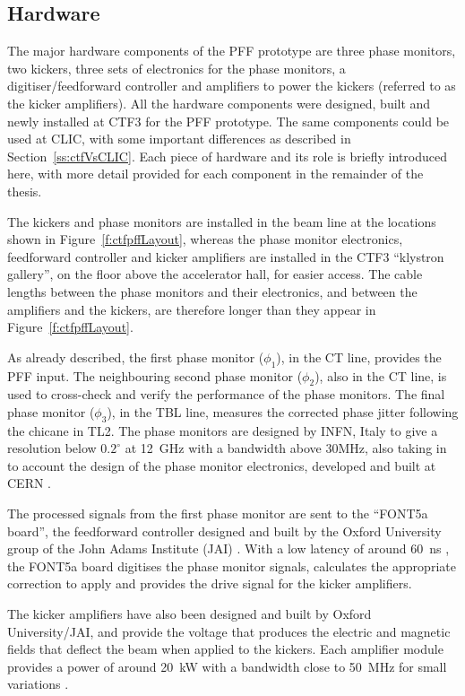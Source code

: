 \subsection{Hardware}
\label{ss:ctfPFFHardware}

The major hardware components of the PFF prototype are three phase monitors, two kickers, three sets of electronics for the phase monitors, a digitiser/feedforward controller and amplifiers to power the kickers (referred to as the kicker amplifiers). All the hardware components were designed, built and newly installed at CTF3 for the PFF prototype. The same components could be used at CLIC, with some important differences as described in Section~\ref{ss:ctfVsCLIC}. Each piece of hardware and its role is briefly introduced here, with more detail provided for each component in the remainder of the thesis.

The kickers and phase monitors are installed in the beam line at the locations shown in Figure~\ref{f:ctfpffLayout}, whereas the phase monitor electronics, feedforward controller and kicker amplifiers are installed in the CTF3 ``klystron gallery'', on the floor above the accelerator hall, for easier access. The cable lengths between the phase monitors and their electronics, and between the amplifiers and the kickers, are therefore longer than they appear in Figure~\ref{f:ctfpffLayout}.

As already described, the first phase monitor (\(\phi_1\)), in the CT line, provides the PFF input. The neighbouring second phase monitor (\(\phi_2\)), also in the CT line, is used to cross-check and verify the performance of the phase monitors. The final phase monitor (\(\phi_3\)), in the TBL line, measures the corrected phase jitter following the chicane in TL2. The phase monitors are designed by INFN, Italy \cite{phMonEuCard} to give a resolution below \(0.2^\circ\) at 12~GHz with a bandwidth above 30MHz, also taking in to account the  design of the phase monitor electronics, developed and built at CERN \cite{phMonEuCard}.

The processed signals from the first phase monitor are sent to the ``FONT5a board'', the feedforward controller designed and built by the Oxford University group of the John Adams Institute (JAI) \cite{fontGroup}. With a low latency of around 60~ns \cite{glennCLIC14}, the FONT5a board digitises the phase monitor signals, calculates the appropriate correction to apply and provides the drive signal for the kicker amplifiers.

The kicker amplifiers have also been designed and built by Oxford University/JAI, and provide the voltage that produces the electric and magnetic fields that deflect the beam when applied to the kickers. Each amplifier module provides a power of around 20~kW with a bandwidth close to 50~MHz for small variations \cite{colinCLIC16}. 


